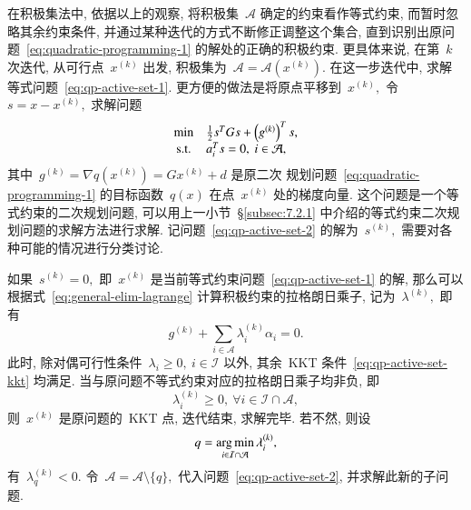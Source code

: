 在积极集法中, 依据以上的观察, 将积极集~$\mathcal{A}$ 确定的约束看作等式约束, 而暂时忽略其余约束条件, 并通过某种迭代的方式不断修正调整这个集合, 直到识别出原问题~\eqref{eq:quadratic-programming-1} 的解处的正确的积极约束. 更具体来说, 在第~$k$ 次迭代, 从可行点~${x}^{(k)}$ 出发,
积极集为~$\mathcal{A} = \mathcal{A}({x}^{(k)}).$ 在这一步迭代中,
求解等式问题~\eqref{eq:qp-active-set-1}. 更方便的做法是将原点平移到~${x}^{(k)},$ 令~${s} = {x} - {x}^{(k)},$ 求解问题
\begin{equation}
\label{eq:qp-active-set-2}
\begin{array}{cl}
\min & \frac{1}{2} {s}^T G {s} + \left( {g}^{(k)} \right)^T {s}, \\
{\rm s.t.} & {a}_i^T {s} = 0, ~ i \in \mathcal{A},
\end{array}
\end{equation}
其中~${g}^{(k)} = \nabla q({x}^{(k)}) = G {x}^{(k)} + {d}$ 是原二次
规划问题~\eqref{eq:quadratic-programming-1} 的目标函数~$q({x})$ 在点~${x}^{(k)}$ 处的梯度向量.  这个问题是一个等式约束的二次规划问题, 可以用上一小节~\S\ref{subsec:7.2.1} 中介绍的等式约束二次规划问题的求解方法进行求解. 记问题~\eqref{eq:qp-active-set-2} 的解为~${s}^{(k)},$ 需要对各种可能的情况进行分类讨论.

如果~${s}^{(k)} = {0},$ 即~${x}^{(k)}$ 是当前等式约束问题~\eqref{eq:qp-active-set-1} 的解, 那么可以根据式~\eqref{eq:general-elim-lagrange} 计算积极约束的拉格朗日乘子, 记为~${\lambda}^{(k)},$  即有
\begin{equation}
\label{eq:qp-active-set-lambda}
{g}^{(k)} + \sum\limits_{i \in \mathcal{A}} \lambda_i^{(k)} \alpha_i = 0.
\end{equation}
此时, 除对偶可行性条件~$\lambda_i \geqslant 0, ~ i \in \mathcal{I}$ 以外, 其余~KKT
条件~\eqref{eq:qp-active-set-kkt} 均满足. 当与原问题不等式约束对应的拉格朗日乘子均非负, 即
\begin{equation*}
\lambda_i^{(k)} \geqslant 0, ~ \forall i \in \mathcal{I} \cap \mathcal{A},
\end{equation*}
则~$x^{(k)}$ 是原问题的~KKT 点, 迭代结束, 求解完毕. 若不然, 则设
\begin{equation}
\label{eq:qp-active-set-inactive-index}
q = \operatorname*{arg\,min}_{i \in \mathcal{I} \cap \mathcal{A}} \lambda_i^{(k)},
\end{equation}
有~$\lambda_q^{(k)} < 0.$ 令~$\mathcal{A} = \mathcal{A} \setminus \{ q \},$
代入问题~\eqref{eq:qp-active-set-2}, 并求解此新的子问题.

